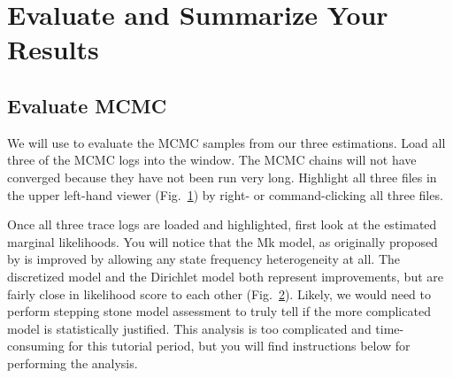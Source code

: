 \bigskip
\section{Evaluate and Summarize Your Results}\label{sec:trace}


\medskip
\subsection{Evaluate MCMC}\label{subsub:Exercise-EvalMCMC}

We will use \Tracer to evaluate the MCMC samples from our three estimations. 
Load all three of the MCMC logs into the \Tracer window.
The MCMC chains will not have converged because they have not been run very long. 
Highlight all three files in the upper left-hand viewer (Fig.~\ref{fig:tracer-files}) by right- or command-clicking all three files.

\begin{figure}[h!]
\label{fig:tracer-files}
\end{figure}

Once all three trace logs are loaded and highlighted, first look at the estimated marginal likelihoods.
You will notice that the Mk model, as originally proposed by \citep{Lewis2001} is improved by allowing any state frequency heterogeneity at all. 
The discretized model and the Dirichlet model both represent improvements, but are fairly close in likelihood score to each other (Fig.~\ref{fig:tracer-llik}).
Likely, we would need to perform stepping stone model assessment to truly tell if the more complicated model is statistically justified.
This analysis is too complicated and time-consuming for this tutorial period, but you will find instructions below for performing the analysis. \par
\begin{figure}[h!]
\label{fig:tracer-llik}
\end{figure}

